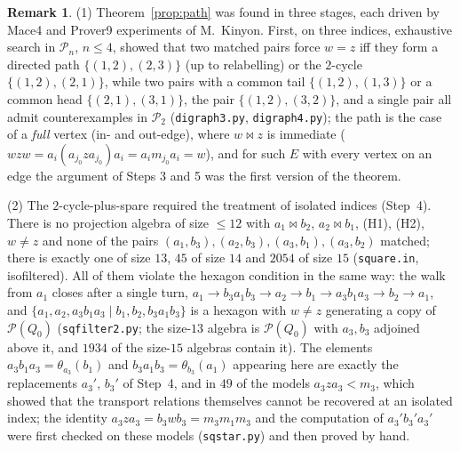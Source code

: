 \documentclass[11pt]{amsart}
\theoremstyle{definition}
\newtheorem{remark}[theorem]{Remark}
\renewcommand{\P}{\mathcal{P}}
\newcommand{\mt}{\bowtie}   %
\begin{document}
\begin{remark}\label{rem:path}
(1) Theorem~\ref{prop:path} was found in three stages, each driven by Mace4 and Prover9 experiments of M.~Kinyon. First, on three indices, exhaustive search in $\P_n$, $n\le4$, showed that two matched pairs force $w=z$ iff they form a directed path $\{(1,2),(2,3)\}$ (up to relabelling) or the $2$-cycle $\{(1,2),(2,1)\}$, while two pairs with a common tail $\{(1,2),(1,3)\}$ or a common head $\{(2,1),(3,1)\}$, the pair $\{(1,2),(3,2)\}$, and a single pair all admit counterexamples in $\P_2$ (\texttt{digraph3.py}, \texttt{digraph4.py}); the path is the case of a \emph{full} vertex (in- and out-edge), where $w\mt z$ is immediate ($wzw=a_i(a_{j_0}za_{j_0})a_i=a_im_{j_0}a_i=w$), and for such $E$ with every vertex on an edge the argument of Steps 3 and 5 was the first version of the theorem.

(2) The $2$-cycle-plus-spare required the treatment of isolated indices (Step~4). There is no projection algebra of size $\le12$ with $a_1\mt b_2$, $a_2\mt b_1$, (H1), (H2), $w\ne z$ and none of the pairs $(a_1,b_3),(a_2,b_3),(a_3,b_1),(a_3,b_2)$ matched; there is exactly one of size $13$, $45$ of size $14$ and $2054$ of size $15$ (\texttt{square.in}, isofiltered). All of them violate the hexagon condition in the same way: the walk from $a_1$ closes after a single turn, $a_1\to b_3a_1b_3\to a_2\to b_1\to a_3b_1a_3\to b_2\to a_1$, and $\{a_1,a_2,a_3b_1a_3\mid b_1,b_2,b_3a_1b_3\}$ is a hexagon with $w\ne z$ generating a copy of $\P(Q_0)$ (\texttt{sqfilter2.py}; the size-$13$ algebra is $\P(Q_0)$ with $a_3,b_3$ adjoined above it, and $1934$ of the size-$15$ algebras contain it). The elements $a_3b_1a_3=\theta_{a_3}(b_1)$ and $b_3a_1b_3=\theta_{b_3}(a_1)$ appearing here are exactly the replacements $a_3'$, $b_3'$ of Step~4, and in $49$ of the models $a_3za_3<m_3$, which showed that the transport relations themselves cannot be recovered at an isolated index; the identity $a_3za_3=b_3wb_3=m_3m_1m_3$ and the computation of $a_3'b_3'a_3'$ were first checked on these models (\texttt{sqstar.py}) and then proved by hand.


\end{remark}
\end{document}
